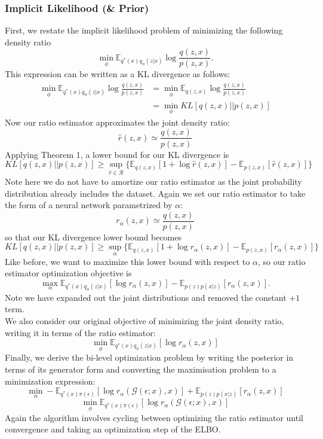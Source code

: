 \documentclass[a4paper,12pt]{article}
\numberwithin{equation}{section}
\begin{document}
\subsubsection{Implicit Likelihood (\& Prior)}
First, we restate the implicit likelihood problem of minimizing the following density ratio
\[\min_\phi \mathbb{E}_{q^*(x)q_\phi(z|x)}\log \frac{q(z,x)}{p(z,x)}.\]
This expression can be written as a KL divergence as follows:
\begin{align*}
\min_\phi \mathbb{E}_{q^*(x)q_\phi(z|x)}\log \frac{q(z,x)}{p(z,x)}&= \min_\phi \mathbb{E}_{q(z,x)}\log \frac{q(z,x)}{p(z,x)}\\
&= \min_\phi KL[q(z,x)||p(z,x)]
\end{align*}
Now our ratio estimator approximates the joint density ratio:
\[\hat{r}(z,x)\simeq \frac{q(z,x)}{p(z,x)}\]
Applying Theorem 1, a lower bound for our KL divergence is
\[KL[q(z,x)||p(z,x)]\geq \sup_{\hat{r}\in \mathcal{R}}\{\mathbb{E}_{q(z,x)}[1+\log \hat{r}(z,x)]-\mathbb{E}_{p(z,x)}[\hat{r}(z,x)]\}\]
Note here we do not have to amortize our ratio estimator as the joint probability distribution already includes the dataset. Again we set our ratio estimator to take the form of a neural network parametrized by $\alpha$:
\[r_\alpha(z,x)\simeq \frac{q(z,x)}{p(z,x)}\]
so that our KL divergence lower bound becomes
\[KL[q(z,x)||p(z,x)]\geq \sup_{\alpha}\{\mathbb{E}_{q(z,x)}[1+\log r_\alpha(z,x)]-\mathbb{E}_{p(z,x)}[r_\alpha(z,x)]\}\]
Like before, we want to maximize this lower bound with respect to $\alpha$, so our ratio estimator optimization objective is
\[\max_\alpha \mathbb{E}_{q^*(x)q_\phi(z|x)}[\log r_\alpha(z,x)]-\mathbb{E}_{p(z)p(x|z)}[r_\alpha(z,x)].\]
Note we have expanded out the joint distributions and removed the constant $+1$ term.\\
We also consider our original objective of minimizing the joint density ratio, writing it in terms of the ratio estimator:
\[\min_\phi \mathbb{E}_{q^*(x)q_\phi(z|x)}[\log r_\alpha(z,x)]\]
Finally, we derive the bi-level optimization problem by writing the posterior in terms of its generator form and converting the maximisation problem to a minimization expression:
\[\min_\alpha -\mathbb{E}_{q^*(x)\pi(\epsilon)}[\log r_\alpha(\mathcal{G}(\epsilon;x),x)]+\mathbb{E}_{p(z)p(x|z)}[r_\alpha(z,x)]\]
\[\min_\phi \mathbb{E}_{q^*(x)\pi(\epsilon)}[\log r_\alpha(\mathcal{G}(\epsilon;x),x)]\]
Again the algorithm involves cycling between optimizing the ratio estimator until convergence and taking an optimization step of the ELBO.
\newpage
\end{document}

